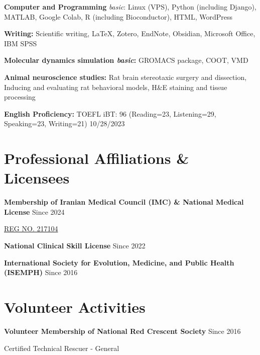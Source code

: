 \documentclass[letterpaper,11pt]{article} %
\begin{document}
\textbf{Computer and Programming} \textit{basic}: Linux (VPS), Python (including Django), MATLAB, Google Colab, R (including Bioconductor), HTML, WordPress

\textbf{Writing:} Scientific writing, {\sffamily\LaTeX}\setmainfont[SmallCapsFont=Fontin SmallCaps]{Fontin-Regular}, Zotero, EndNote, Obsidian, Microsoft Office, IBM SPSS

\textbf{Molecular dynamics simulation \textit{basic}:} GROMACS package, COOT, VMD

\textbf{Animal neuroscience studies:} Rat brain stereotaxic surgery and dissection, Inducing and evaluating rat behavioral models, H\&E staining and tissue processing

\textbf{English Proficiency:} TOEFL iBT: 96 \footnotesize (Reading=23, Listening=29, Speaking=23, Writing=21) \hfill 10/28/2023 \normalsize

\section{Professional Affiliations \& Licensees}
\textbf{Membership of Iranian Medical Council (IMC) \& National Medical License } \hfill \footnotesize{Since 2024} \normalsize
\vspace{-0.5\baselineskip}
\begin{adjustwidth}{1 cm}{}
\href{https://membersearch.irimc.org/member/profile?id=b7b9a1b7-9e08-4628-a8f8-dde64f3ea2e6}{REG NO. 217104 \faExternalLink*}
\end{adjustwidth}


\textbf{National Clinical Skill License} \hfill \footnotesize{Since 2022} \normalsize

\textbf{International Society for Evolution, Medicine, and Public Health (ISEMPH)} \href{https://isemph.org/}{\faExternalLink*} \hfill \footnotesize{Since 2016} \normalsize

\newpage

\section{Volunteer Activities}

\textbf{Volunteer Membership of National Red Crescent Society} \hfill \footnotesize{Since 2016} \normalsize
\vspace{-0.5\baselineskip}
\begin{adjustwidth}{1 cm}{}
Certified Technical Rescuer - General
\end{adjustwidth}
\end{document}
